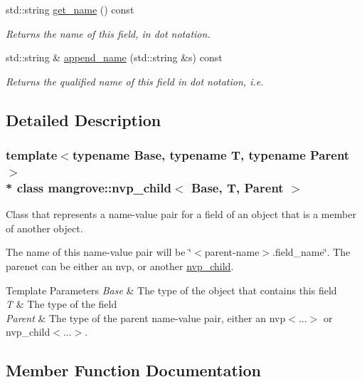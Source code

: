 \begin{DoxyCompactItemize}
std\+::string \hyperlink{classmangrove_1_1nvp__child_a8e1a8a94e98375c642ad8afc000e9655}{get\+\_\+name} () const 
\begin{DoxyCompactList}\small\item\em Returns the name of this field, in dot notation. \end{DoxyCompactList}\item 
std\+::string \& \hyperlink{classmangrove_1_1nvp__child_a762e5f23a23e6860f1259501e80c0aee}{append\+\_\+name} (std\+::string \&s) const 
\begin{DoxyCompactList}\small\item\em Returns the qualified name of this field in dot notation, i.\+e. \end{DoxyCompactList}\end{DoxyCompactItemize}


\subsection{Detailed Description}
\subsubsection*{template$<$typename Base, typename T, typename Parent$>$\\*
class mangrove\+::nvp\+\_\+child$<$ Base, T, Parent $>$}

Class that represents a name-\/value pair for a field of an object that is a member of another object. 

The name of this name-\/value pair will be \char`\"{}$<$parent-\/name$>$.\+field\+\_\+name\char`\"{}. The parenet can be either an nvp, or another \hyperlink{classmangrove_1_1nvp__child}{nvp\+\_\+child}. 
\begin{DoxyTemplParams}{Template Parameters}
{\em Base} & The type of the object that contains this field \\
\hline
{\em T} & The type of the field \\
\hline
{\em Parent} & The type of the parent name-\/value pair, either an nvp$<$...$>$ or nvp\+\_\+child$<$...$>$. \\
\hline
\end{DoxyTemplParams}


\subsection{Member Function Documentation}
